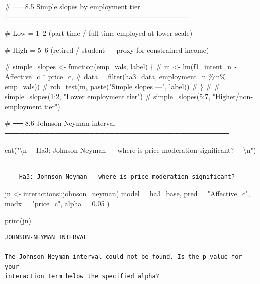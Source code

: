 \documentclass[
  letterpaper,
  DIV=11,
  numbers=noendperiod]{scrartcl}
\newenvironment{Shaded}{\begin{snugshade}}{\end{snugshade}}
\newcommand{\AttributeTok}[1]{\textcolor[rgb]{0.40,0.45,0.13}{#1}}
\newcommand{\CommentTok}[1]{\textcolor[rgb]{0.37,0.37,0.37}{#1}}
\newcommand{\FloatTok}[1]{\textcolor[rgb]{0.68,0.00,0.00}{#1}}
\newcommand{\FunctionTok}[1]{\textcolor[rgb]{0.28,0.35,0.67}{#1}}
\newcommand{\NormalTok}[1]{\textcolor[rgb]{0.00,0.23,0.31}{#1}}
\newcommand{\OtherTok}[1]{\textcolor[rgb]{0.00,0.23,0.31}{#1}}
\newcommand{\SpecialCharTok}[1]{\textcolor[rgb]{0.37,0.37,0.37}{#1}}
\newcommand{\StringTok}[1]{\textcolor[rgb]{0.13,0.47,0.30}{#1}}
\begin{document}
\begin{Shaded}
\begin{Highlighting}[]
\CommentTok{\# ── 8.5  Simple slopes by employment tier ─────────────────────────────────────}

\CommentTok{\# Low = 1–2 (part{-}time / full{-}time employed at lower scale)}

\CommentTok{\# High = 5–6 (retired / student — proxy for constrained income)}

\CommentTok{\# simple\_slopes \textless{}{-} function(emp\_vals, label) \{}
\CommentTok{\#   m \textless{}{-} lm(f1\_intent\_n \textasciitilde{} Affective\_c * price\_c,}
\CommentTok{\#           data = filter(ha3\_data, employment\_n \%in\% emp\_vals))}
\CommentTok{\#   rob\_test(m, paste("Simple slopes —", label))}
\CommentTok{\# \}}
\CommentTok{\# }
\CommentTok{\# simple\_slopes(1:2, "Lower employment tier")}
\CommentTok{\# simple\_slopes(5:7, "Higher/non{-}employment tier")}

\CommentTok{\# ── 8.6  Johnson{-}Neyman interval ─────────────────────────────────────────────}

\FunctionTok{cat}\NormalTok{(}\StringTok{"}\SpecialCharTok{\textbackslash{}n}\StringTok{{-}{-}{-} Ha3: Johnson{-}Neyman — where is price moderation significant? {-}{-}{-}}\SpecialCharTok{\textbackslash{}n}\StringTok{"}\NormalTok{)}
\end{Highlighting}
\end{Shaded}

\begin{verbatim}

--- Ha3: Johnson-Neyman — where is price moderation significant? ---
\end{verbatim}

\begin{Shaded}
\begin{Highlighting}[]
\NormalTok{jn }\OtherTok{\textless{}{-}}\NormalTok{ interactions}\SpecialCharTok{::}\FunctionTok{johnson\_neyman}\NormalTok{(}
  \AttributeTok{model =}\NormalTok{ ha3\_base, }\AttributeTok{pred =} \StringTok{"Affective\_c"}\NormalTok{, }\AttributeTok{modx =} \StringTok{"price\_c"}\NormalTok{, }\AttributeTok{alpha =} \FloatTok{0.05}
\NormalTok{)}

\FunctionTok{print}\NormalTok{(jn)}
\end{Highlighting}
\end{Shaded}

\begin{verbatim}
JOHNSON-NEYMAN INTERVAL

The Johnson-Neyman interval could not be found. Is the p value for your
interaction term below the specified alpha?
\end{verbatim}
\end{document}
